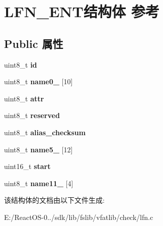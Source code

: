 \hypertarget{struct_l_f_n___e_n_t}{}\section{L\+F\+N\+\_\+\+E\+N\+T结构体 参考}
\label{struct_l_f_n___e_n_t}
\subsection*{Public 属性}
\begin{DoxyCompactItemize}
\item 
\mbox{\label{struct_l_f_n___e_n_t_a0250c27195a629f39b8a8cc706098fbd}} 
uint8\+\_\+t {\bfseries id}
\item 
\mbox{\label{struct_l_f_n___e_n_t_ae4d83fc80d8fc507bf15f58fba3d95e6}} 
uint8\+\_\+t {\bfseries name0\+\_} \mbox{[}10\mbox{]}
\item 
\mbox{\label{struct_l_f_n___e_n_t_a6806015f4edf412b91ffc57c9ee3d4ac}} 
uint8\+\_\+t {\bfseries attr}
\item 
\mbox{\label{struct_l_f_n___e_n_t_a32203ab2f25244424015a7953f242b7c}} 
uint8\+\_\+t {\bfseries reserved}
\item 
\mbox{\label{struct_l_f_n___e_n_t_ac30fe94f92db04c7299187b44ea922dd}} 
uint8\+\_\+t {\bfseries alias\+\_\+checksum}
\item 
\mbox{\label{struct_l_f_n___e_n_t_a09c39cf79bc0360fe014af7aafb85119}} 
uint8\+\_\+t {\bfseries name5\+\_} \mbox{[}12\mbox{]}
\item 
\mbox{\label{struct_l_f_n___e_n_t_ab18fe5f3005e3296ecd532c4052a2bc1}} 
uint16\+\_\+t {\bfseries start}
\item 
\mbox{\label{struct_l_f_n___e_n_t_ad1ccc71e58ce91e917e0c179e14ba0c2}} 
uint8\+\_\+t {\bfseries name11\+\_} \mbox{[}4\mbox{]}
\end{DoxyCompactItemize}


该结构体的文档由以下文件生成\+:\begin{DoxyCompactItemize}
\item 
E\+:/\+React\+O\+S-\/0../sdk/lib/fslib/vfatlib/check/lfn.\+c\end{DoxyCompactItemize}
